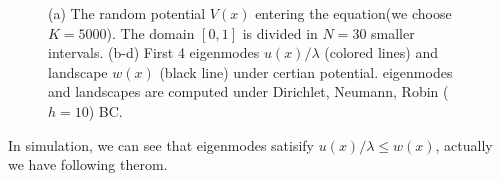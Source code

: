 \documentclass[12pt,a4paper]{article}
\begin{document}
\begin{figure}[h]
\centering
{}
\caption{(a) The random potential $V(x)$ entering the equation(we choose $K = 5000$). The domain $[0,1]$ is divided in $N = 30$ smaller intervals. (b-d) First 4 eigenmodes $u(x) / \lambda$ (colored lines) and landscape $w(x)$ (black line) under certian potential. eigenmodes and landscapes are computed under Dirichlet, Neumann, Robin ($h = 10$) BC.}
\label{fig:1}
\end{figure}

In simulation, we can see that eigenmodes satisify $u(x) / \lambda \leq w(x)$, actually we have following therom.
\end{document}
